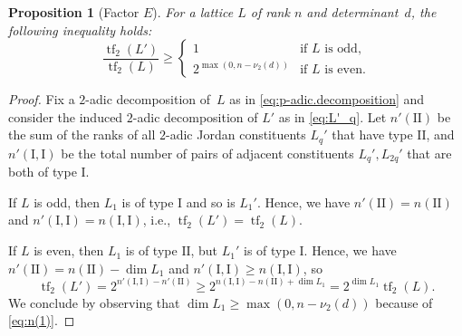 \documentclass[a4paper]{amsart}
\theoremstyle{definition}
\theoremstyle{plain}
\newtheorem{proposition}[definition]{Proposition}
\DeclareMathOperator{\tf}{tf}
\newcommand{\I}{\mathrm{I}}
\newcommand{\II}{\mathrm{II}}
\begin{document}
\begin{proposition}[Factor \(E\)] \label{prop:factor.E}
For a lattice \(L\) of rank \(n\) and determinant~\(d\), the following inequality holds:
\[
    \frac{\tf_2(L')}{\tf_2(L)} \geq 
        \begin{cases} 
            1 & \text{if \(L\) is odd,} \\
            2^{\max(0,n-\nu_2(d))} & \text{if \(L\) is even.}
        \end{cases}
\]
\end{proposition}
\begin{proof}
    Fix a \(2\)-adic decomposition of~\(L\) as in \eqref{eq:p-adic.decomposition} and consider the induced \(2\)-adic decomposition of \(L'\) as in \eqref{eq:L'_q}. Let \(n'(\II)\) be the sum of the ranks of all \(2\)-adic Jordan constituents \(L_q'\) that have type \(\II\), and \(n'(\I,\I)\) be the total number of pairs of adjacent constituents \(L_q',L_{2q}'\) that are both of type \(\I\). 
    
    If \(L\) is odd, then \(L_1\) is of type \(\I\) and so is \(L_1'\). 
    Hence, we have \(n'(\II) = n(\II)\) and \(n'(\I,\I) = n(\I,\I)\), i.e., \(\tf_2(L') = \tf_2(L)\).

    If \(L\) is even, then \(L_1\) is of type \(\II\), but \(L_1'\) is of type \(\I\). Hence, we have \(n'(\II) = n(\II) - \dim L_1\) and \(n'(\I,\I) \geq n(\I,\I)\), so
    \[
        \tf_2(L') = 2^{n'(\I,\I) - n'(\II)} \geq 2^{n(\I,\I) - n(\II) + \dim L_1} = 2^{\dim L_1} \tf_2(L).
    \]
    We conclude by observing that \(\dim L_1 \geq \max(0,n-\nu_2(d))\) because of \eqref{eq:n(1)}.
\end{proof}
\end{document}

